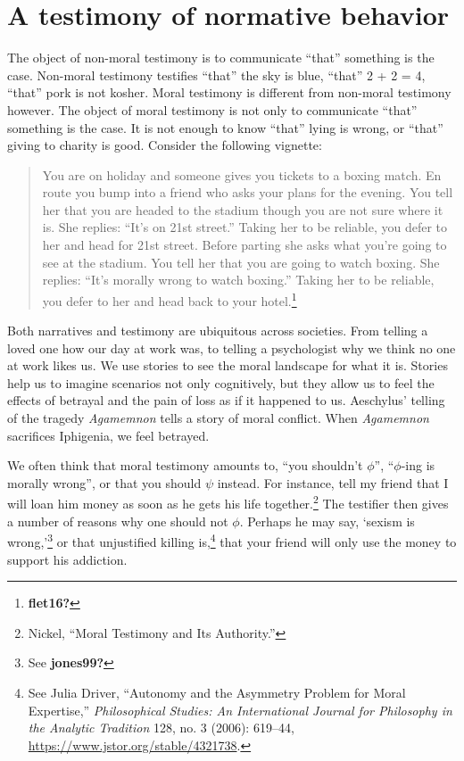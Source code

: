 \documentclass[phdthesis,12pt,final]{wuthesis}
\theoremstyle{definition}
\theoremstyle{definition}
\theoremstyle{definition}
\theoremstyle{definition}
\theoremstyle{remark}
\begin{document}
\section{A testimony of normative behavior}\label{a-testimony-of-normative-behavior}

The object of non-moral testimony is to communicate ``that'' something is the case. Non-moral testimony testifies ``that'' the sky is blue, ``that'' 2 + 2 = 4, ``that'' pork is not kosher. Moral testimony is different from non-moral testimony however. The object of moral testimony is not only to communicate ``that'' something is the case. It is not enough to know ``that'' lying is wrong, or ``that'' giving to charity is good. Consider the following vignette:

\begin{quote}
You are on holiday and someone gives you tickets to a boxing match. En route you bump into a friend who asks your plans for the evening. You tell her that you are headed to the stadium though you are not sure where it is. She replies: ``It's on 21st street.'' Taking her to be reliable, you defer to her and head for 21st street. Before parting she asks what you're going to see at the stadium. You tell her that you are going to watch boxing. She replies: ``It's morally wrong to watch boxing.'' Taking her to be reliable, you defer to her and head back to your hotel.\footnote{\textbf{flet16?}}
\end{quote}

Both narratives and testimony are ubiquitous across societies. From telling a loved one how our day at work was, to telling a psychologist why we think no one at work likes us. We use stories to see the moral landscape for what it is. Stories help us to imagine scenarios not only cognitively, but they allow us to feel the effects of betrayal and the pain of loss as if it happened to us. Aeschylus' telling of the tragedy \emph{Agamemnon} tells a story of moral conflict. When \emph{Agamemnon} sacrifices Iphigenia, we feel betrayed.

We often think that moral testimony amounts to, ``you shouldn't \(\phi\)'', ``\(\phi\)-ing is morally wrong'', or that you should \(\psi\) instead. For instance, tell my friend that I will loan him money as soon as he gets his life together.\footnote{Nickel, {``Moral {Testimony} and Its {Authority}.''}} The testifier then gives a number of reasons why one should not \(\phi\). Perhaps he may say, `sexism is wrong,'\footnote{See \textbf{jones99?}} or that unjustified killing is,\footnote{See Julia Driver, {``Autonomy and the {Asymmetry Problem} for {Moral Expertise},''} \emph{Philosophical Studies: An International Journal for Philosophy in the Analytic Tradition} 128, no. 3 (2006): 619--44, \url{https://www.jstor.org/stable/4321738}.} that your friend will only use the money to support his addiction.
\end{document}
